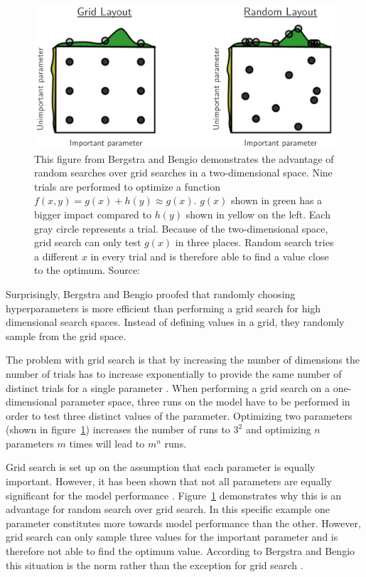 \begin{figure}[ht]
	\centering
	\includegraphics[scale=0.35]{figures/03_theory/03_randomSearch}
	\caption{This figure from Bergstra and Bengio demonstrates the advantage of random searches over grid searches in a two-dimensional space. Nine trials are performed to optimize a function $f(x, y) = g(x) + h(y) \approx g(x)$. $g(x)$ shown in green has a bigger impact compared to $h(y)$ shown in yellow on the left. Each gray circle represents a trial. Because of the two-dimensional space, grid search can only test $g(x)$ in three places. Random search tries a different $x$ in every trial and is therefore able to find a value close to the optimum. Source: \cite{Bergstra2012a}}
	\label{fig:03_randomSearch}
\end{figure}

Surprisingly, Bergstra and Bengio proofed that randomly choosing hyperparameters is more efficient than performing a grid search \cite{Bergstra2012a} for high dimensional search spaces. Instead of defining values in a grid, they randomly sample from the grid space.

The problem with grid search is that by increasing the number of dimensions the number of trials has to increase exponentially to provide the same number of distinct trials for a single parameter \cite{Bergstra2012a}. When performing a grid search on a one-dimensional parameter space, three runs on the model have to be performed in order to test three distinct values of the parameter. Optimizing two parameters {(shown in figure~\ref{fig:03_randomSearch})} increases the number of runs to $3^2$ and optimizing $n$ parameters $m$ times will lead to $m^n$ runs. 

Grid search is set up on the assumption that each parameter is equally important. However, it has been shown that not all parameters are equally significant for the model performance \cite{Bergstra2012a}. Figure~\ref{fig:03_randomSearch} demonstrates why this is an advantage for random search over grid search. In this specific example one parameter constitutes more towards model performance than the other. However, grid search can only sample three values for the important parameter and is therefore not able to find the optimum value. According to Bergstra and Bengio this situation is the norm rather than the exception for grid search \cite{Bergstra2012a}.

